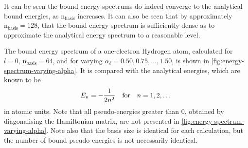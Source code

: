 \documentclass[]{article}
\begin{document}
It can be seen the bound energy spectrums do indeed converge to the analytical
bound energies, as $\mathrm{n_{basis}}$ increases.
It can also be seen that by approximately $\mathrm{n_{basis}} = 128$, that the
bound energy spectrum is sufficiently dense as to approximate the analytical
energy spectrum to a reasonable level.


The bound energy spectrum of a one-electron Hydrogen atom, calculated for
$l = 0$, $\mathrm{n_{basis}} = 64$, and for varying
$\alpha_{\ell} = 0.50, 0.75, \dotsc, 1.50$, is shown in
\autoref{fig:energy-spectrum-varying-alpha}.
It is compared with the analytical energies, which are known to be
\begin{equation*}
  E_{n}
  =
  -
  \dfrac{1}{2 n^{2}}
  \qq{for}
  n = 1, 2, \dotsc
\end{equation*}
in atomic units.
Note that all pseudo-energies greater than 0, obtained by diagonalising the
Hamiltonian matrix, are not presented in
\autoref{fig:energy-spectrum-varying-alpha}.
Note also that the basis size is identical for each calculation, but the number
of bound pseudo-energies is not necessarily identical.
\end{document}
